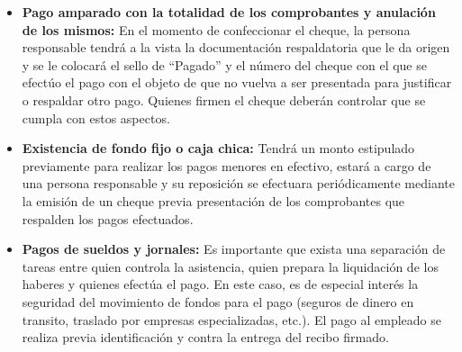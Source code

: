 \begin{itemize}
  \item \textbf{Pago amparado con la totalidad de los comprobantes y anulación de los mismos:}
En el momento de confeccionar el cheque, la persona responsable tendrá a la vista la
documentación respaldatoria que le da origen y se le colocará el sello de “Pagado” y el
número del cheque con el que se efectúo el pago con el objeto de que no vuelva a ser
presentada para justificar o respaldar otro pago. Quienes firmen el cheque deberán
controlar que se cumpla con estos aspectos.
  \item \textbf{Existencia de fondo fijo o caja chica:}
Tendrá un monto estipulado previamente para realizar los pagos menores en efectivo, estará
a cargo de una persona responsable y su reposición se efectuara periódicamente mediante
la emisión de un cheque previa presentación de los comprobantes que respalden los pagos
efectuados.
  \item \textbf{Pagos de sueldos y jornales:}
Es importante que exista una separación de tareas entre quien controla la asistencia, quien
prepara la liquidación de los haberes y quienes efectúa el pago. En este caso, es de
especial interés la seguridad del movimiento de fondos para el pago (seguros de dinero en
transito, traslado por empresas especializadas, etc.). El pago al empleado se realiza previa
identificación y contra la entrega del recibo firmado.
\end{itemize}
